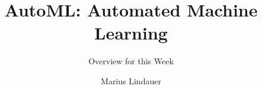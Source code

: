 




\title[AutoML: Overview]{AutoML: Automated Machine Learning}
\subtitle{Overview for this Week}
\author{Marius Lindauer}
\date{}





	
	\maketitle
	


